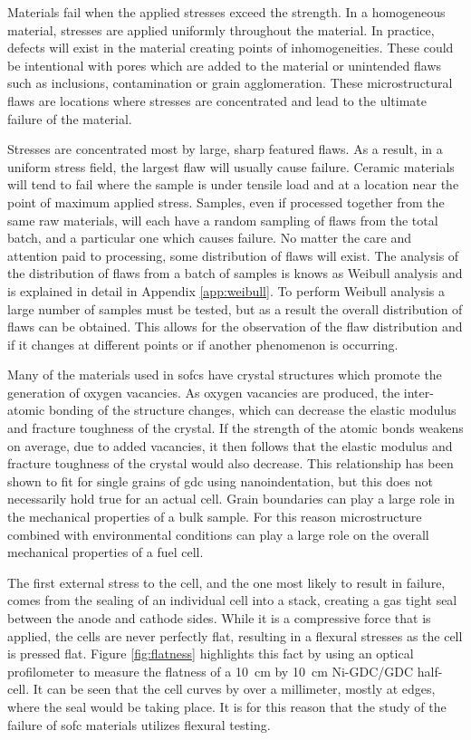     Materials fail when the applied stresses exceed the strength.
    In a homogeneous material, stresses are applied uniformly throughout the material.
    In practice, defects will exist in the material creating points of inhomogeneities.
    These could be intentional with pores which are added to the material or unintended flaws such as inclusions, contamination or grain agglomeration.
    These microstructural flaws are locations where stresses are concentrated and lead to the ultimate failure of the material.

    Stresses are concentrated most by large, sharp featured flaws.
    As a result, in a uniform stress field, the largest flaw will usually cause failure.
    Ceramic materials will tend to fail where the sample is under tensile load and at a location near the point of maximum applied stress.
    Samples, even if processed together from the same raw materials, will each have a random sampling of flaws from the total batch, and a particular one which causes failure.
    No matter the care and attention paid to processing, some distribution of flaws will exist.
    The analysis of the distribution of flaws from a batch of samples is knows as Weibull analysis and is explained in detail in Appendix \ref{app:weibull}.
    To perform Weibull analysis a large number of samples must be tested, but as a result the overall distribution of flaws can be obtained.
    This allows for the observation of the flaw distribution and if it changes at different points or if another phenomenon is occurring.

    Many of the materials used in \glspl{sofc} have crystal structures which promote the generation of oxygen vacancies.
    As oxygen vacancies are produced, the inter-atomic bonding of the structure changes, which can decrease the elastic modulus and fracture toughness of the crystal.\cite{Bishop2014,Duncan2006}
    If the strength of the atomic bonds weakens on average, due to added vacancies, it then follows that the elastic modulus and fracture toughness of the crystal would also decrease.
    This relationship has been shown to fit for single grains of \gls{gdc} using nanoindentation, but this does not necessarily hold true for an actual cell.\cite{Wang2007}
    Grain boundaries can play a large role in the mechanical properties of a bulk sample.
    For this reason microstructure combined with environmental conditions can play a large role on the overall mechanical properties of a fuel cell.

    The first external stress to the cell, and the one most likely to result in failure, comes from the  sealing of an individual cell into a stack, creating a gas tight seal between the anode and cathode sides.
    While it is a compressive force that is applied, the cells are never perfectly flat, resulting in a flexural stresses as the cell is pressed flat.
    Figure \ref{fig:flatness} highlights this fact by using an optical profilometer to measure the flatness of a \SI{10}{\centi\meter} by \SI{10}{\centi\meter} Ni-GDC/GDC half-cell.
    It can be seen that the cell curves by over a millimeter, mostly at edges, where the seal would be taking place.
    It is for this reason that the study of the failure of \gls{sofc} materials utilizes flexural testing.

